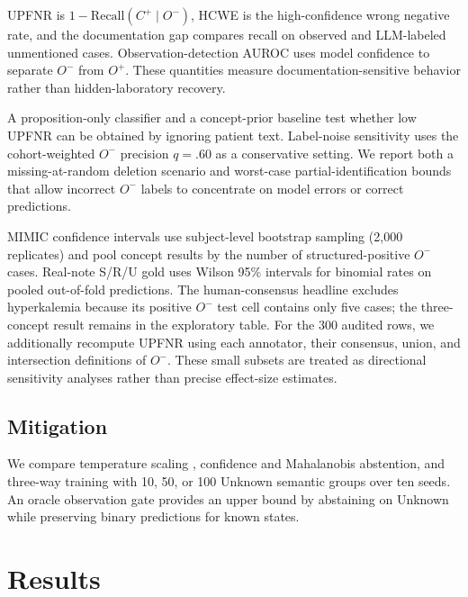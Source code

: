 \documentclass[11pt]{article}
\begin{document}
UPFNR is $1-\mathrm{Recall}(C^+\mid O^-)$, HCWE is the high-confidence wrong
negative rate, and the documentation gap compares recall on observed and
LLM-labeled unmentioned cases. Observation-detection AUROC uses model
confidence to separate $O^-$ from $O^+$. These quantities measure
documentation-sensitive behavior rather than hidden-laboratory recovery.

A proposition-only classifier and a concept-prior baseline test whether low
UPFNR can be obtained by ignoring patient text. Label-noise sensitivity uses
the cohort-weighted $O^-$ precision $q=.60$ as a conservative setting. We
report both a missing-at-random deletion scenario and worst-case
partial-identification bounds that allow incorrect $O^-$ labels to concentrate
on model errors or correct predictions.

MIMIC confidence intervals use subject-level bootstrap sampling (2{,}000
replicates) and pool concept results by the number of structured-positive $O^-$
cases. Real-note S/R/U gold uses Wilson 95\% intervals for binomial rates on
pooled out-of-fold predictions. The human-consensus headline excludes
hyperkalemia because its positive $O^-$ test cell contains only five cases;
the three-concept result remains in the exploratory table.
For the 300 audited rows, we additionally recompute UPFNR using each annotator,
their consensus, union, and intersection definitions of $O^-$. These small
subsets are treated as directional sensitivity analyses rather than precise
effect-size estimates.

\subsection{Mitigation}
We compare temperature scaling \citep{guo-etal-2017-calibration}, confidence
and Mahalanobis abstention,
and three-way training with 10, 50, or 100 Unknown semantic groups over ten
seeds. An oracle observation gate provides an upper bound by abstaining on
Unknown while preserving binary predictions for known states.

\section{Results}
\end{document}
